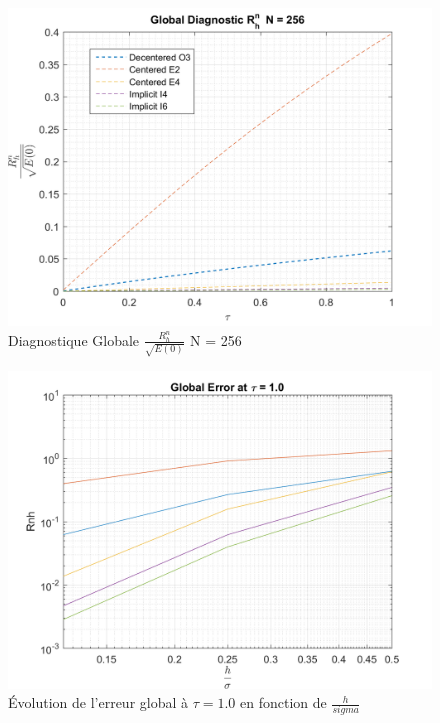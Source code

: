 \documentclass{article}
\begin{document}
\begin{figure}[H]
    \centering
    \includegraphics[scale=0.45]{img/fig6c.png}
    \caption{Diagnostique Globale $\frac{R_h^n}{\sqrt{E(0)}}$ N = 256 }
    \label{fig6c}
\end{figure}
\begin{figure}[H]
    \centering
    \includegraphics[scale=0.45]{img/fig9.png}
    \caption{Évolution de l'erreur global à $\tau = 1.0$ en fonction de $\frac{h}{sigma}$}
    \label{fig9}
\end{figure}
\newpage
\end{document}
